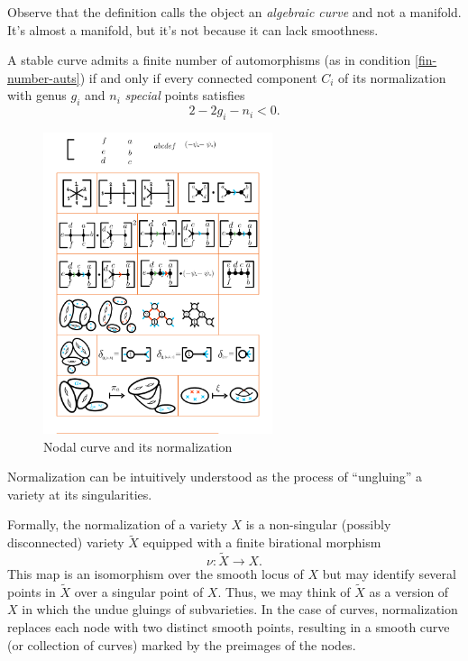 \documentclass[12pt]{memoir}
\begin{document}
\begin{Rmk}
Observe that the definition calls the object an \emph{algebraic curve} and not a manifold. It's almost a manifold, but it's not because it can lack smoothness.
\end{Rmk}

\begin{Th}\label{th-stability-condition-22gn}
A stable curve admits a finite number of automorphisms (as in condition \ref{fin-number-auts}) if and only if every connected component $C_i$ of its normalization with genus $g_i$ and $n_i$ \emph{special} points satisfies 
$$2-2g_i-n_i<0.$$
\end{Th}

\begin{Rmk} %
\begin{figure}[h!]
        \centering
        \includegraphics[width=0.6\textwidth, trim= 1.32cm 9.5cm 12.7cm 15.4cm,clip]{../figs/FigsDNnotability1.pdf}
        \caption{Nodal curve and its normalization}
        \label{fig:normalization-example}
    \end{figure}
Normalization can be intuitively understood as the process of ``ungluing'' a variety at its singularities.\par
Formally, the normalization of a variety $X$ is a non-singular (possibly disconnected) variety $\widetilde X$ equipped with a finite birational morphism 
$$\nu:\widetilde X\to X.$$
This map is an isomorphism over the smooth locus of $X$ but may identify several points in $\widetilde X$ over a singular point of $X$. Thus, we may think of $\widetilde X$ as a version of $X$ in which the undue gluings of subvarieties. In the case of curves, normalization replaces each node with two distinct smooth points, resulting in a smooth curve (or collection of curves) marked by the preimages of the nodes. 
\end{Rmk}
\end{document}
